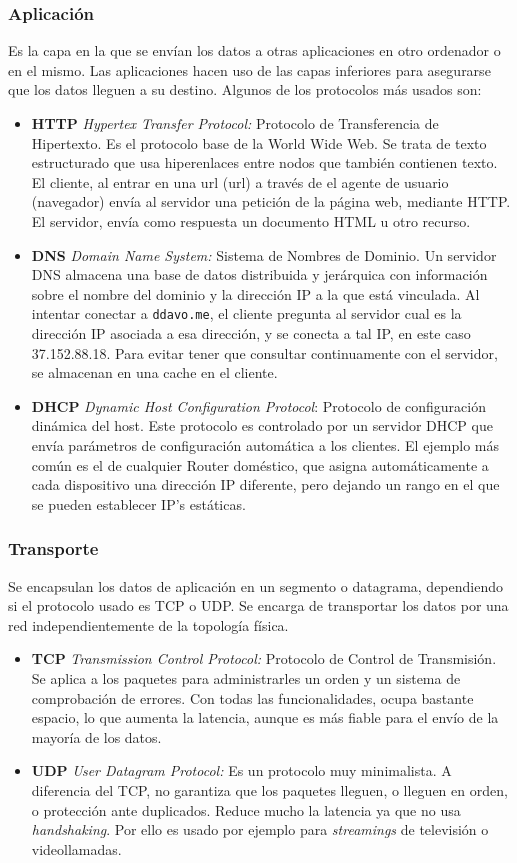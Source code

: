 \documentclass[a4paper, 11pt]{report} %
\newcommand{\acr}[1]{\acrshort{#1} (\acrlong{#1})}
\begin{document}
\subsubsection{Aplicación}
Es la capa en la que se envían los datos a otras aplicaciones en otro ordenador o en el mismo. Las aplicaciones hacen uso de las capas inferiores para asegurarse que los datos lleguen a su destino. Algunos de los protocolos más usados son:
\begin{itemize}
\item \textbf{HTTP} \textit{Hypertex Transfer Protocol:} Protocolo de Transferencia de Hipertexto. Es el protocolo base de la World Wide Web. Se trata de texto estructurado que usa hiperenlaces entre nodos que también contienen texto. El cliente, al entrar en una \acr{url} a través de el agente de usuario (navegador) envía al servidor una petición de la página web, mediante HTTP. El servidor, envía como respuesta un documento HTML u otro recurso.
\item \textbf{DNS} \textit{Domain Name System:} Sistema de Nombres de Dominio. Un servidor DNS almacena una base de datos distribuida y jerárquica con información sobre el nombre del dominio y la dirección IP a la que está vinculada. Al intentar conectar a  \texttt{ddavo.me}, el cliente pregunta al servidor cual es la dirección IP asociada a esa dirección, y se conecta a tal IP, en este caso 37.152.88.18. Para evitar tener que consultar continuamente con el servidor, se almacenan en una \gls{cache} en el cliente.
\item \textbf{DHCP} \textit{Dynamic Host Configuration Protocol}: Protocolo de configuración dinámica del host. Este protocolo es controlado por un servidor DHCP que envía parámetros de configuración automática a los clientes. El ejemplo más común es el de cualquier Router doméstico, que asigna automáticamente a cada dispositivo una dirección IP diferente, pero dejando un rango en el que se pueden establecer IP's estáticas.
\end{itemize}
\subsubsection{Transporte}
Se encapsulan los datos de aplicación en un segmento o datagrama, dependiendo si el protocolo usado es TCP o UDP. Se encarga de transportar los datos por una red independientemente de la topología física.
\begin{itemize}
\item \textbf{TCP} \textit{Transmission Control Protocol:} Protocolo de Control de Transmisión. Se aplica a los paquetes para administrarles un orden y un sistema de comprobación de errores. Con todas las funcionalidades, ocupa bastante espacio, lo que aumenta la latencia, aunque es más fiable para el envío de la mayoría de los datos.
\item \textbf{UDP} \textit{User Datagram Protocol:} Es un protocolo muy minimalista. A diferencia del TCP, no garantiza que los paquetes lleguen, o lleguen en orden, o protección ante duplicados. Reduce mucho la latencia ya que no usa \textit{handshaking}. Por ello es usado por ejemplo para \textit{streamings} de televisión o videollamadas.
\end{itemize}
\end{document}
